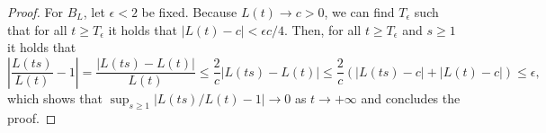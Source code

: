\documentclass{article}
\numberwithin{equation}{section}
\begin{document}
\begin{proof}
    For \(B_L\), let \(\epsilon<2\) be fixed. Because \(L(t)\to
    c>0\), we can find
    \(T_\epsilon\) such that for all \(t\geq T_{\epsilon}\) it holds that
    \(\left|L(t)-c\right|<\epsilon c/4\). Then, for all \(t\geq T_{\epsilon}\)
    and \(s\geq 1\) it holds that
    \begin{equation*}
        \left|\frac{L(ts)}{L(t)}-1\right|=\frac{\left|L(ts)-L(t)\right|}{L(t)}\leq
        \frac{2}{c}\left|L(ts)-L(t)\right|\leq
        \frac{2}{c}\left(\left|L(ts)-c\right|+\left|L(t)-c\right|\right)\leq
        \epsilon,
    \end{equation*}
    which shows that \(\sup_{s\geq 1}\left|L(ts)/L(t)-1\right|\to 0\)
    as \(t\to+\infty\) and concludes the proof.
\end{proof}
\end{document}

